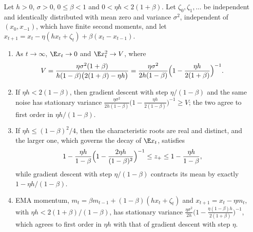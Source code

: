 \begin{refsection}
\begin{theorem}\label{thm:momentum:noise}
Let $h>0$, $\sigma>0$, $0\le\beta<1$ and $0<\eta h<2(1+\beta)$. Let $\zeta_0,\zeta_1,\dots$ be independent and identically distributed with mean zero and variance $\sigma^2$, independent of $(x_0,x_{-1})$, which have finite second moments, and let $x_{t+1}=x_t-\eta(hx_t+\zeta_t)+\beta(x_t-x_{t-1})$.
\begin{enumerate}
\item As $t\to\infty$, $\E x_t\to0$ and $\E x_t^2\to V$, where
\begin{equation}\label{eq:momentum:variance}
  V=\frac{\eta\sigma^2(1+\beta)}{h(1-\beta)\bigl(2(1+\beta)-\eta h\bigr)}=\frac{\eta\sigma^2}{2h(1-\beta)}\Bigl(1-\frac{\eta h}{2(1+\beta)}\Bigr)^{-1}.
\end{equation}
\item If $\eta h<2(1-\beta)$, then gradient descent with step $\eta/(1-\beta)$ and the same noise has stationary variance $\frac{\eta\sigma^2}{2h(1-\beta)}\bigl(1-\frac{\eta h}{2(1-\beta)}\bigr)^{-1}\ge V$; the two agree to first order in $\eta h/(1-\beta)$.
\item If $\eta h\le(1-\beta)^2/4$, then the characteristic roots are real and distinct, and the larger one, which governs the decay of $\E x_t$, satisfies
\[
  1-\frac{\eta h}{1-\beta}\Bigl(1-\frac{2\eta h}{(1-\beta)^2}\Bigr)^{-1}\le z_+\le1-\frac{\eta h}{1-\beta},
\]
while gradient descent with step $\eta/(1-\beta)$ contracts its mean by exactly $1-\eta h/(1-\beta)$.
\item EMA momentum, $m_t=\beta m_{t-1}+(1-\beta)(hx_t+\zeta_t)$ and $x_{t+1}=x_t-\eta m_t$, with $\eta h<2(1+\beta)/(1-\beta)$, has stationary variance $\frac{\eta\sigma^2}{2h}\bigl(1-\frac{\eta(1-\beta)h}{2(1+\beta)}\bigr)^{-1}$, which agrees to first order in $\eta h$ with that of gradient descent with step $\eta$.
\end{enumerate}
\end{theorem}


\end{refsection}
